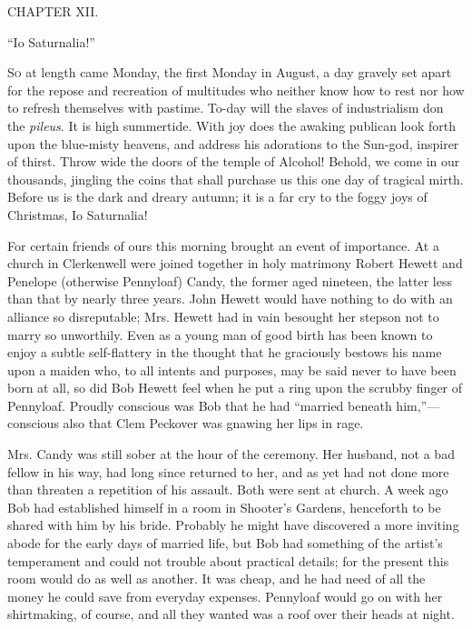 {}

{CHAPTER XII.}

``Io Saturnalia!''

\textsc{So} at length came Monday, the first Monday in August, a day
gravely set apart for the repose and recreation of multitudes who
neither know how to rest nor how to refresh themselves with pastime.
To-day will the slaves of industrialism don the \emph{pileus}. It is
high summertide. With joy does the awaking publican look forth upon the
blue-misty heavens, and address his adorations to the Sun-god, inspirer
of thirst. Throw wide the doors of the temple of Alcohol! Behold, we
come in our thousands, jingling the coins that shall purchase us this
one day of tragical mirth. Before us is the dark and dreary autumn; it
is a far cry to the foggy joys of Christmas, Io Saturnalia!

For certain friends of ours this morning {}brought an event of
importance. At a church in Clerkenwell were joined together in holy
matrimony Robert Hewett and Penelope (otherwise Pennyloaf) Candy, the
former aged nineteen, the latter less than that by nearly three years.
John Hewett would have nothing to do with an alliance so disreputable;
Mrs. Hewett had in vain besought her stepson not to marry so unworthily.
Even as a young man of good birth has been known to enjoy a subtle
self-flattery in the thought that he graciously bestows his name upon a
maiden who, to all intents and purposes, may be said never to have been
born at all, so did Bob Hewett feel when he put a ring upon the scrubby
finger of Pennyloaf. Proudly conscious was Bob that he had ``married
beneath him,''---conscious also that Clem Peckover was gnawing her lips
in rage.

Mrs. Candy was still sober at the hour of the ceremony. Her husband, not
a bad fellow in his way, had long since returned to her, and as yet had
not done more than threaten a repetition of his assault. Both were
{}sent at church. A week ago Bob had established himself in a room in
Shooter's Gardens, henceforth to be shared with him by his bride.
Probably he might have discovered a more inviting abode for the early
days of married life, but Bob had something of the artist's temperament
and could not trouble about practical details; for the present this room
would do as well as another. It was cheap, and he had need of all the
money he could save from everyday expenses. Pennyloaf would go on with
her shirtmaking, of course, and all they wanted was a roof over their
heads at night.

